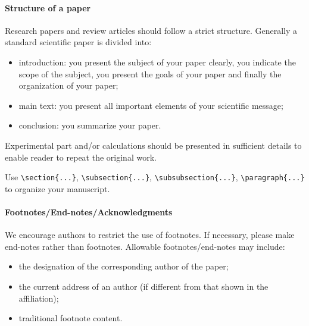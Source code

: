 \documentclass[CEJCS,PDF]{cej} %
\begin{document}
\paragraph{Structure of a paper}
    Research papers and review articles should follow a strict structure. Generally a standard scientific paper is divided into:
\begin{itemize}
\item introduction: you present the subject of your paper clearly, you indicate the scope of the subject, you present the goals of your paper and finally the organization of your paper;
\item main text: you present all important elements of your scientific message;
\item conclusion: you summarize your paper.
\end{itemize}


    Experimental part and/or calculations should be presented in sufficient details to enable reader to repeat the original work.


Use
\verb+\section{...}+,
\verb+\subsection{...}+,
\verb+\subsubsection{...}+,
\verb+\paragraph{...}+
to organize your manuscript.


\paragraph{Footnotes/End-notes/Acknowledgments}
We encourage authors to restrict the use of footnotes. If necessary, please make end-notes rather than footnotes. Allowable footnotes/end-notes may include:

\begin{itemize}
\item the designation of the corresponding author of the paper;
\item the current address of an author (if different from that shown in the affiliation);
\item traditional footnote content.
\end{itemize}
\end{document}
